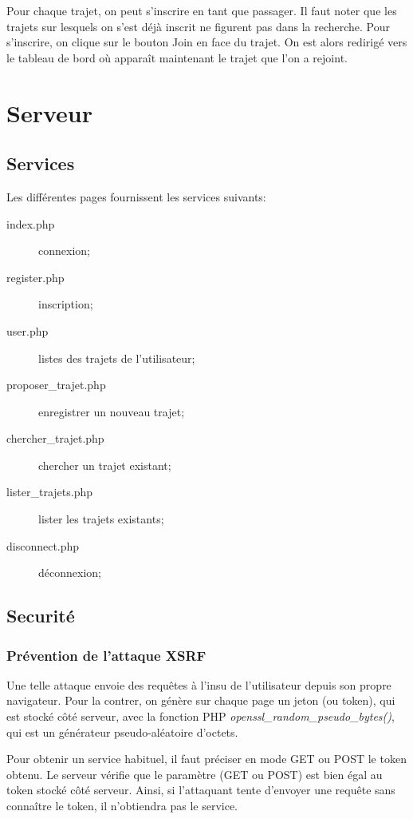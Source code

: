 \documentclass[a4paper]{article}
\begin{document}
Pour chaque trajet, on peut s'inscrire en tant que passager. Il faut
noter que les trajets sur lesquels on s'est déjà inscrit ne figurent
pas dans la recherche. Pour s'inscrire, on clique sur le bouton \og Join \fg
en face du trajet. On est alors redirigé vers le tableau de bord où apparaît
maintenant le trajet que l'on a rejoint.

\section{Serveur}
\subsection{Services}

Les différentes pages fournissent les services suivants:
\begin{description}
	\item[index.php] connexion;
	\item[register.php] inscription;
	\item[user.php] listes des trajets de l'utilisateur;
	\item[proposer\_trajet.php] enregistrer un nouveau trajet;
	\item[chercher\_trajet.php] chercher un trajet existant;
	\item[lister\_trajets.php] lister les trajets existants;
	\item[disconnect.php] déconnexion;
\end{description}

\subsection{Securité}
\subsubsection{Prévention de l'attaque XSRF}
 		
Une telle attaque envoie des requêtes à l'insu de l'utilisateur
depuis son propre navigateur. Pour la contrer, on génère sur
chaque page un jeton (ou token), qui est stocké côté serveur,
avec la fonction PHP  \textit{openssl\_random\_pseudo\_bytes()},
qui est un générateur pseudo-aléatoire d'octets.

Pour obtenir un service habituel, il faut préciser en mode GET
ou POST le token obtenu. Le serveur vérifie que le paramètre
(GET ou POST) est bien égal au token stocké côté serveur.
Ainsi, si l'attaquant tente d'envoyer une requête sans connaître le
token, il n'obtiendra pas le service.
\end{document}

